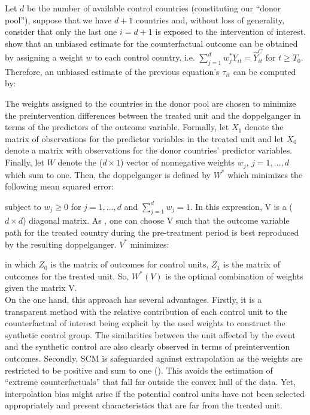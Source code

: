 \documentclass[11pt, a4paper, leqno]{article}
\begin{document}
Let $d$ be the number of available control countries (constituting our ``donor pool''), suppose that we have $d+1$ countries and, without loss of generality, consider that only the last one $i=d+1$ is exposed to the intervention of interest. \citet{Abadie2010} show that an unbiased estimate for the counterfactual outcome can be obtained by assigning a weight $w$ to each control country, i.e. $\sum_{j=1}^{d}w^*_j Y_{it} = \hat{Y}_{it}^C$ for $t \geq T_0$. Therefore, an unbiased estimate of the previous equation's $\tau_{it}$ can be computed by:

The weights assigned to the countries in the donor pool are chosen to minimize the preintervention differences between the treated unit and the doppelganger in terms of the predictors of the outcome variable. Formally, let $X_1$ denote the matrix of observations for the predictor variables in the treated unit and let $X_0$ denote a matrix with observations for the donor countries' predictor variables. Finally, let $W$ denote the ($d \times 1$) vector of nonnegative weights $w_j$, $j=1,...,d$ which sum to one. Then, the doppelganger is defined by $W^*$ which minimizes the following mean squared error:

subject to $w_j \geq 0$ for $j=1,...,d$ and $\sum_{j=1}^{d}w_j = 1$. In this expression, V is a ($d \times d$) diagonal matrix. As \citet{Abadie2003}, one can choose V such that the outcome variable path for the treated country during the pre-treatment period is best reproduced by the resulting doppelganger. $V^*$ minimizes:

in which $Z_0$ is the matrix of outcomes for control units, $Z_1$ is the matrix of outcomes for the treated unit. So, $W^*(V)$ is the optimal combination of weights given the matrix V. \\

On the one hand, this approach has several advantages. Firstly, it is a transparent method with the relative contribution of each control unit to the counterfactual of interest being explicit by the used weights to construct the synthetic control group. The similarities between the unit affected by the  event and the synthetic control are also clearly observed in terms of preintervention outcomes. Secondly, SCM is safeguarded against extrapolation as the weights are restricted to be positive and sum to one (\citet{Abadie2010}). This avoids the estimation of ``extreme counterfactuals” that fall far outside the convex hull of the data. Yet, interpolation bias might arise if the potential control units have not been selected appropriately and present characteristics that are far from the treated unit. \\
\end{document}
